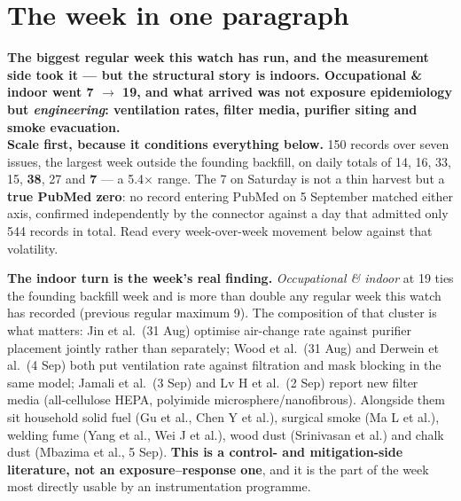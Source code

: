 \documentclass[10pt]{article}
\begin{document}
\vspace{6mm}

\section*{\sffamily\bfseries\color{Deep}The week in one paragraph}
\vspace{-1.5mm}{\color{Teal}\rule{\linewidth}{1.1pt}}\vspace{2.5mm}

\begin{keybox}
{\sffamily\bfseries\small\color{Deep}The biggest regular week this watch has run, and the
measurement side took it --- but the structural story is indoors. Occupational \& indoor
went 7 $\rightarrow$ 19, and what arrived was not exposure epidemiology but
\emph{engineering}: ventilation rates, filter media, purifier siting and smoke evacuation.}\\[1.4mm]
\footnotesize
\textbf{Scale first, because it conditions everything below.} 150 records over seven
issues, the largest week outside the founding backfill, on daily totals of 14, 16, 33, 15,
\textbf{38}, 27 and \textbf{7} --- a 5.4$\times$ range. The 7 on Saturday is not a thin
harvest but a \textbf{true PubMed zero}: no record entering PubMed on 5 September matched
either axis, confirmed independently by the connector against a day that admitted only 544
records in total. Read every week-over-week movement below against that volatility.

\textbf{The indoor turn is the week's real finding.} \textit{Occupational \& indoor} at 19
ties the founding backfill week and is more than double any regular week this watch has
recorded (previous regular maximum 9). The composition of that cluster is what matters:
Jin et al.\ (31 Aug) optimise air-change rate against purifier placement jointly rather
than separately; Wood et al.\ (31 Aug) and Derwein et al.\ (4 Sep) both put ventilation
rate against filtration and mask blocking in the same model; Jamali et al.\ (3 Sep) and
Lv H et al.\ (2 Sep) report new filter media (all-cellulose HEPA, polyimide
microsphere/nanofibrous). Alongside them sit household solid fuel (Gu et al., Chen Y
et al.), surgical smoke (Ma L et al.), welding fume (Yang et al., Wei J et al.), wood dust
(Srinivasan et al.) and chalk dust (Mbazima et al., 5 Sep). \textbf{This is a control- and
mitigation-side literature, not an exposure--response one}, and it is the part of the week
most directly usable by an instrumentation programme.


\end{keybox}
\end{document}
